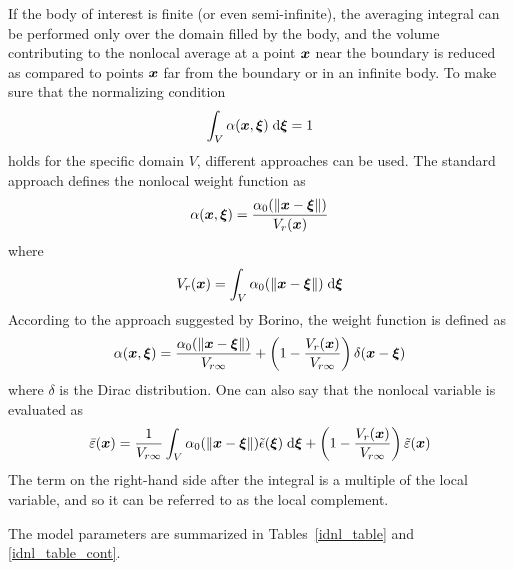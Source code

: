 \documentclass[a4paper]{article}
\newcommand{\mbf}[1]{\mbox{\boldmath$#1$}}
\begin{document}
If the body of interest is finite (or even semi-infinite), the averaging
integral can be performed only over
the domain filled by the body, and the volume contributing to the nonlocal
average at a point $\mbf{x}$ near the boundary is reduced as compared to 
points  $\mbf{x}$ far from the boundary or in an infinite body. To make sure
that the normalizing condition
$$
\int_{V} \alpha(\mbf{x},\mbf{\xi})\;{\rm d}\mbf{\xi} = 1
$$
holds for the specific domain $V$, different approaches can be used.
The standard approach defines the nonlocal weight function as  
$$
\alpha(\mbf{x},\mbf{\xi})=\frac{\alpha_0(\Vert\mbf{x}-\mbf{\xi}\Vert)}{V_r(\mbf{x})}
$$
where
$$
V_r(\mbf{x}) = \int_{V} \alpha_0(\Vert\mbf{x}-\mbf{\xi}\Vert)\;{\rm d}\mbf{\xi} 
$$
According to the approach suggested by Borino, the weight function is defined as
$$
\alpha(\mbf{x},\mbf{\xi})=\frac{\alpha_0(\Vert\mbf{x}-\mbf{\xi}\Vert)}{V_{r\infty}} + \left(1-\frac{V_r(\mbf{x})}{V_{r\infty}}\right)\delta(\mbf{x}-\mbf{\xi})
$$
where $\delta$ is the Dirac distribution. One can also say that the
nonlocal variable is evaluated as
$$
\bar\varepsilon(\mbf{x}) = \frac{1}{V_{r\infty}}\int_V\alpha_0(\Vert\mbf{x}-\mbf{\xi}\Vert)\tilde\epsilon(\mbf{\xi})\;{\rm d}\mbf{\xi}+\left(1-\frac{V_r(\mbf{x})}{V_{r\infty}}\right)\tilde\varepsilon(\mbf{x})
$$
The term on the right-hand side after the integral is a multiple of the local
variable, and so it can be referred to as the local complement.  

The model parameters are summarized
in Tables~\ref{idnl_table} and \ref{idnl_table_cont}.
\end{document}
